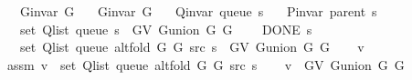 \begin{isabellebody}
\ \ \ {\isachardoublequoteopen}G{\isachardot}{\kern0pt}invar\ G{}{\isachardoublequoteclose}\isanewline
\ \ \ {\isachardoublequoteopen}G{\isachardot}{\kern0pt}invar\ G{}{\isachardoublequoteclose}\isanewline
\ \ \ {\isachardoublequoteopen}Q{\isacharunderscore}{\kern0pt}invar\ {\isacharparenleft}{\kern0pt}queue\ s{\isacharparenright}{\kern0pt}{\isachardoublequoteclose}\isanewline
\ \ \ {\isachardoublequoteopen}P{\isacharunderscore}{\kern0pt}invar\ {\isacharparenleft}{\kern0pt}parent\ s{\isacharparenright}{\kern0pt}{\isachardoublequoteclose}\isanewline
\ \ \ {\isachardoublequoteopen}set\ {\isacharparenleft}{\kern0pt}Q{\isacharunderscore}{\kern0pt}list\ {\isacharparenleft}{\kern0pt}queue\ s{\isacharparenright}{\kern0pt}{\isacharparenright}{\kern0pt}\ {\isasymsubseteq}\ G{\isachardot}{\kern0pt}V\ {\isacharparenleft}{\kern0pt}G{\isachardot}{\kern0pt}union\ G{}\ G{}{\isacharparenright}{\kern0pt}{\isachardoublequoteclose}\isanewline
\ \ \ {\isachardoublequoteopen}{\isasymnot}\ DONE\ s{\isachardoublequoteclose}\isanewline
\ \ \ {\isachardoublequoteopen}set\ {\isacharparenleft}{\kern0pt}Q{\isacharunderscore}{\kern0pt}list\ {\isacharparenleft}{\kern0pt}queue\ {\isacharparenleft}{\kern0pt}alt{\isacharunderscore}{\kern0pt}fold\ G{}\ G{}\ src\ s{\isacharparenright}{\kern0pt}{\isacharparenright}{\kern0pt}{\isacharparenright}{\kern0pt}\ {\isasymsubseteq}\ G{\isachardot}{\kern0pt}V\ {\isacharparenleft}{\kern0pt}G{\isachardot}{\kern0pt}union\ G{}\ G{}{\isacharparenright}{\kern0pt}{\isachardoublequoteclose}\isanewline
%
\isadelimproof
%
\endisadelimproof
%
\isatagproof
{}\isamarkupfalse%
\isanewline
\ \ \isamarkupfalse%
\ v\isanewline
\ \ \isamarkupfalse%
\ assm{\isacharcolon}{\kern0pt}\ {\isachardoublequoteopen}v\ {\isasymin}\ set\ {\isacharparenleft}{\kern0pt}Q{\isacharunderscore}{\kern0pt}list\ {\isacharparenleft}{\kern0pt}queue\ {\isacharparenleft}{\kern0pt}alt{\isacharunderscore}{\kern0pt}fold\ G{}\ G{}\ src\ s{\isacharparenright}{\kern0pt}{\isacharparenright}{\kern0pt}{\isacharparenright}{\kern0pt}{\isachardoublequoteclose}\isanewline
\ \ \isamarkupfalse%
\ {\isachardoublequoteopen}v\ {\isasymin}\ G{\isachardot}{\kern0pt}V\ {\isacharparenleft}{\kern0pt}G{\isachardot}{\kern0pt}union\ G{}\ G{}{\isacharparenright}{\kern0pt}{\isachardoublequoteclose}\isanewline

\end{isabellebody}
